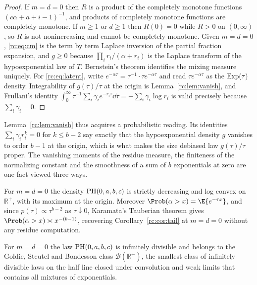 \begin{proof}
If $m=d=0$ then $R$ is a product of the completely monotone functions $(c\alpha+a+i-1)^{-1}$, and products of completely monotone functions are completely monotone. If $m\ge1$ or $d\ge1$ then $R(0)=0$ while $R>0$ on $(0,\infty)$, so $R$ is not nonincreasing and cannot be completely monotone. Given $m=d=0$, \eqref{rc:eq:cm} is the term by term Laplace inversion of the partial fraction expansion, and $g\ge0$ because $\prod_ir_i/(\alpha+r_i)$ is the Laplace transform of the hypoexponential law of $T$. Bernstein's theorem identifies the mixing measure uniquely. For \eqref{rc:eq:latent}, write $e^{-\alpha\tau}=\tau^{-1}\cdot\tau e^{-\alpha\tau}$ and read $\tau e^{-\alpha\tau}$ as the $\mathrm{Exp}(\tau)$ density. Integrability of $g(\tau)/\tau$ at the origin is Lemma~\ref{rc:lem:vanish}, and Frullani's identity $\int_0^\infty\tau^{-1}\sum_i\gamma_ie^{-r_i\tau}\dd\tau=-\sum_i\gamma_i\log r_i$ is valid precisely because $\sum_i\gamma_i=0$.
\end{proof}

Lemma~\ref{rc:lem:vanish} thus acquires a probabilistic reading. Its identities $\sum_i\gamma_ir_i^k=0$ for $k\le b-2$ say exactly that the hypoexponential density $g$ vanishes to order $b-1$ at the origin, which is what makes the size debiased law $g(\tau)/\tau$ proper. The vanishing moments of the residue measure, the finiteness of the normalizing constant and the smoothness of a sum of $b$ exponentials at zero are one fact viewed three ways.

\begin{corollary}\label{rc:cor:shape}
For $m=d=0$ the density $\mathrm{PH}(0,a,b,c)$ is strictly decreasing and log convex on $\mathbb{R}^+$, with its maximum at the origin. Moreover $\Prob(\alpha>x)=\E\{e^{-\tau x}\}$, and since $p(\tau)\propto\tau^{b-2}$ as $\tau\downarrow0$, Karamata's Tauberian theorem gives $\Prob(\alpha>x)\asymp x^{-(b-1)}$, recovering Corollary~\ref{rc:cor:tail} at $m=d=0$ without any residue computation.
\end{corollary}

\begin{corollary}\label{rc:cor:id}
For $m=d=0$ the law $\mathrm{PH}(0,a,b,c)$ is infinitely divisible and belongs to the Goldie, Steutel and Bondesson class $\mathcal{B}(\mathbb{R}^+)$, the smallest class of infinitely divisible laws on the half line closed under convolution and weak limits that contains all mixtures of exponentials.
\end{corollary}

